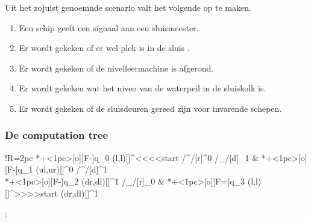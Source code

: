 Uit het zojuist genoemnde scenario valt het volgende op te maken.
\begin{enumerate}
	\item Een schip geeft een signaal aan een sluismeester.
	\item Er wordt gekeken of er wel plek is in de sluis .
	\item Er wordt gekeken of de nivelleermachine is afgerond.
	\item Er wordt gekeken wat het niveo van de waterpeil in de sluiskolk is.
	\item Er wordt gekeken of de sluisdeuren gereed zijn voor invarende schepen.
\end{enumerate}



	\subsubsection{De computation tree}

\xymatrix@ur@!R=2pc{%
	*+<1pc>[o][F-]{q_0}  \ar@(l,l)[]^<<<<{start} \ar@/^/[r]^0  \ar@/_/[d]_1 
	& *+<1pc>[o][F-]{q_1} \ar@(ul,ur)[]^{0}  \ar@/^/[d]^1 \\
	*+<1pc>[o][F-]{q_2} \ar@(dr,dl)[]^{1} \ar@/_/[r]_0 
	& *+<1pc>[o][F=]{q_3} \ar@(l,l)[]^>>>>{start}  \ar@(dr,dl)[]^{1} \\

 }





;






